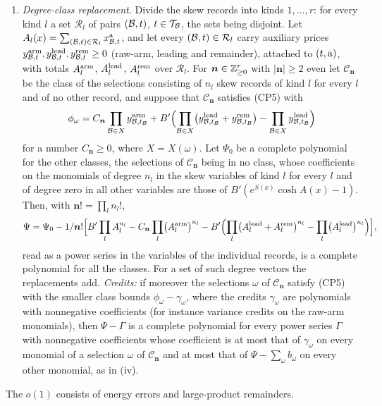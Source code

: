 \begin{lemma}
\begin{enumerate}[label=(\roman*)]
\item \emph{Degree-class replacement.} Divide the skew records into kinds
 $1,\dots,r$: for every kind $l$ a set $\mathcal R_l$ of pairs $(\Blk,t)$,
 $t\in\mathcal T_\Blk$, the sets being disjoint. Let
 $A_l(x)=\sum_{(\Blk,t)\in\mathcal R_l}x^{\rm a}_{\Blk,t}$, and let every
 $(\Blk,t)\in\mathcal R_l$ carry auxiliary prices
 $y^{\rm arm}_{\Blk,t},y^{\rm lead}_{\Blk,t},y^{\rm rem}_{\Blk,t}\ge0$ (raw-arm,
 leading and remainder), attached to $(t,{\rm a})$, with totals
 $A^{\rm arm}_l$, $A^{\rm lead}_l$, $A^{\rm rem}_l$ over $\mathcal R_l$. For
 $\boldsymbol n\in\Z_{\ge0}^r$ with $|\boldsymbol n|\ge2$ even let $\mathcal
 C_{\boldsymbol n}$ be the class of the selections consisting of $n_l$ skew
 records of kind $l$ for every $l$ and of no other record, and suppose that
 $\mathcal C_{\boldsymbol n}$ satisfies (CP5) with
 \[
  \phi_\omega=C_{\boldsymbol n}\prod_{\Blk\in X}y^{\rm arm}_{\Blk,t_\Blk}
  +B'\Bigl(\prod_{\Blk\in X}\bigl(y^{\rm lead}_{\Blk,t_\Blk}
  +y^{\rm rem}_{\Blk,t_\Blk}\bigr)-\prod_{\Blk\in X}y^{\rm lead}_{\Blk,t_\Blk}\Bigr)
 \]
 for a number $C_{\boldsymbol n}\ge0$, where $X=X(\omega)$. Let $\Psi_0$ be a
 complete polynomial for the other classes, the selections of $\mathcal
 C_{\boldsymbol n}$ being in no class, whose coefficients on the monomials of
 degree $n_l$ in the skew variables of kind $l$ for every $l$ and of degree
 zero in all other variables are those of $B'(e^{S(x)}\cosh A(x)-1)$. Then,
 with $\boldsymbol n!=\prod_ln_l!$,
 \[
  \Psi=\Psi_0-\frac1{\boldsymbol n!}\Bigl[B'\prod_lA_l^{n_l}
  -C_{\boldsymbol n}\prod_l\bigl(A^{\rm arm}_l\bigr)^{n_l}
  -B'\Bigl(\prod_l\bigl(A^{\rm lead}_l+A^{\rm rem}_l\bigr)^{n_l}
  -\prod_l\bigl(A^{\rm lead}_l\bigr)^{n_l}\Bigr)\Bigr],
 \]
 read as a power series in the variables of the individual records, is a
 complete polynomial for all the classes. For a set of such degree vectors
 the replacements add. \emph{Credits:} if moreover the selections $\omega$ of
 $\mathcal C_{\boldsymbol n}$ satisfy (CP5) with the smaller class bounds
 $\phi_\omega-\gamma_\omega$, where the credits $\gamma_\omega$ are polynomials
 with nonnegative coefficients (for instance variance credits on the raw-arm
 monomials), then $\Psi-\Gamma$ is a complete polynomial for every power
 series $\Gamma$ with nonnegative coefficients whose coefficient is at most
 that of $\gamma_\omega$ on every monomial of a selection $\omega$ of $\mathcal
 C_{\boldsymbol n}$ and at most that of $\Psi-\sum_\omega b_\omega$ on every
 other monomial, as in (iv).
\end{enumerate}
The $o(1)$ consists of energy errors and large-product remainders.
\end{lemma}

